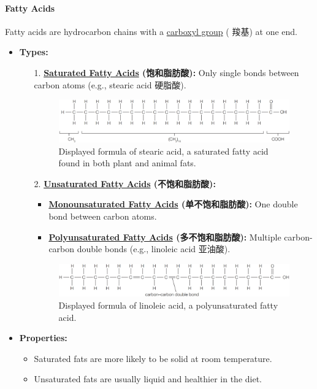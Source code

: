 \paragraph{Fatty Acids} Fatty acids are hydrocarbon chains with a \underline{carboxyl group} ( 羧基) at one end.
\begin{itemize}
    \item \textbf{Types:}
    \begin{itemize}
        \item[1.] \textbf{\underline{Saturated Fatty Acids} (饱和脂肪酸):} Only single bonds between carbon atoms (e.g., stearic
        acid 硬脂酸).
        \begin{figure}[H]
            \centering
            \includegraphics[scale=0.28]{Biology/1A/Images/1A-4-2.png}
            \caption{Displayed formula of stearic acid, a saturated fatty acid found in both plant and animal fats.}
        \end{figure}
        \item[2.] \textbf{\underline{Unsaturated Fatty Acids} (不饱和脂肪酸):}
        \begin{itemize}
            \item \textbf{\underline{Monounsaturated Fatty Acids} (单不饱和脂肪酸):} One double bond between carbon atoms.
            \item \textbf{\underline{Polyunsaturated Fatty Acids} (多不饱和脂肪酸):} Multiple carbon-carbon double bonds
            (e.g., linoleic acid 亚油酸).
        \end{itemize}
        \begin{figure}[H]
            \centering
            \includegraphics[scale=0.28]{Biology/1A/Images/1A-4-3.png}
            \caption{Displayed formula of linoleic acid, a polyunsaturated fatty acid.}
        \end{figure}
    \end{itemize}
    \item \textbf{Properties:}
    \begin{itemize}
        \item Saturated fats are more likely to be solid at room temperature.
        \item Unsaturated fats are usually liquid and healthier in the diet.
    \end{itemize}
\end{itemize}

